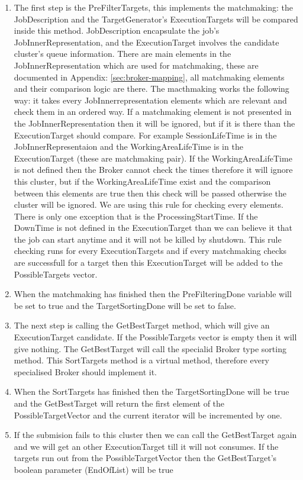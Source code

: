 \documentclass{book}
\begin{document}
\begin{enumerate}
\item{The first step is the PreFilterTargets, this implements the matchmaking: the JobDescription and the TargetGenerator's ExecutionTargets will be compared inside this method. JobDescription encapsulate the job's JobInnerRepresentation, and the ExecutionTarget involves the candidate cluster's queue information. There are main elements in the JobInnerRepresentation which are used for matchmaking, these are documented in  Appendix: \ref{sec:broker-mapping}, all matchmaking elements and their comparison logic are there. The macthmaking works the following way: it takes every JobInnerrepresentation elements which are relevant and  check them in an ordered way. If a matchmaking element is not presented in the JobInnerRepresentation then it will be ignored, but if it is there than the ExecutionTarget should compare. For example SessionLifeTime is in the JobInnerRepresentaion and the WorkingAreaLifeTime is in the ExecutionTarget (these are matchmaking pair). If the WorkingAreaLifeTime is not defined then the Broker cannot check the times therefore it will ignore this cluster, but if the WorkingAreaLifeTime exist and the comparison between this elements are true then this check will be passed otherwise the cluster will be ignored. We are using this rule for checking every elements. There is only one exception that is the ProcessingStartTime. If the DownTime is not defined in the ExecutionTarget than we can believe it that the job can start anytime and it will not be killed by shutdown. This rule checking runs for every ExecutionTargets and if every matchmaking checks are successfull for a target then this ExecutionTarget will be added to the PossibleTargets vector.}
\item{When the matchmaking has finished then  the PreFilteringDone variable will be set to true and the TargetSortingDone will be set to false. }
\item{The next step is calling the GetBestTarget method, which will give an ExecutionTarget candidate. If the PossibleTargets vector is empty then it will give nothing. The GetBestTarget will call the specialid Broker type sorting  method. This SortTargets method is a virtual method, therefore every specialised Broker should implement it.}
\item{When the SortTargets has finished then the TargetSortingDone will be true and the GetBestTarget will return the first element of the PossibleTargetVector and the current iterator will be incremented by one.}
\item{If the submision fails to this cluster then we can call the GetBestTarget again and we will get an other ExecutionTarget till it will not consumes. If  the targets run out from the PossibleTargetVector then the GetBestTarget's boolean parameter (EndOfList) will be true}
\end{enumerate}
\end{document}
